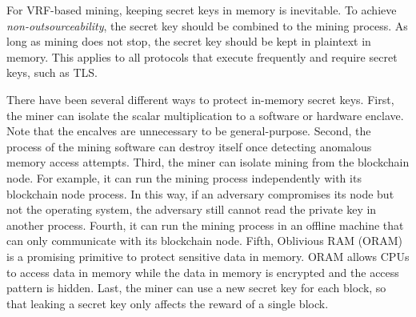 For VRF-based mining, keeping secret keys in memory is inevitable.
To achieve \emph{non-outsourceability}, the secret key should be combined to the mining process.
As long as mining does not stop, the secret key should be kept in plaintext in memory.
This applies to all protocols that execute frequently and require secret keys, such as TLS.

There have been several different ways to protect in-memory secret keys.
First, the miner can isolate the scalar multiplication to a software or hardware enclave.
Note that the encalves are unnecessary to be general-purpose.
Second, the process of the mining software can destroy itself once detecting anomalous memory access attempts.
Third, the miner can isolate mining from the blockchain node.
For example, it can run the mining process independently with its blockchain node process.
In this way, if an adversary compromises its node but not the operating system, the adversary still cannot read the private key in another process.
Fourth, it can run the mining process in an offline machine that can only communicate with its blockchain node.
Fifth, Oblivious RAM (ORAM) is a promising primitive to protect sensitive data in memory.
ORAM allows CPUs to access data in memory while the data in memory is encrypted and the access pattern is hidden.
Last, the miner can use a new secret key for each block, so that leaking a secret key only affects the reward of a single block.
